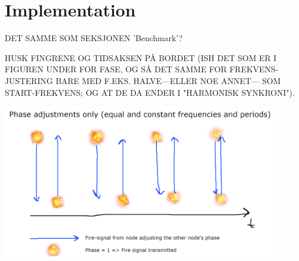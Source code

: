 \section*{Implementation}
	
	DET SAMME SOM SEKSJONEN 'Benchmark'?
	\nl
	
	\nl
	
	
	
	
	HUSK FINGRENE OG TIDSAKSEN PÅ BORDET (ISH DET SOM ER I FIGUREN UNDER FOR FASE, OG SÅ DET SAMME FOR FREKVENS-JUSTERING BARE MED F.EKS. HALVE—ELLER NOE ANNET— SOM START-FREKVENS; OG AT DE DA ENDER I "HARMONISK SYNKRONI").
	
	\begin{center}
	\includegraphics[width=0.90\textwidth]{Assets/Figures/phase_adjustments.png}
	\end{center}